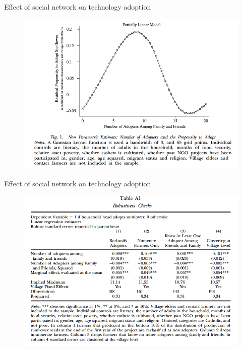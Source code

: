 \documentclass{beamer}
\begin{document}
\begin{frame}{Effect of social network on technology adoption}{}
\begin{figure}[h]
\begin{centering}
  \includegraphics[width=\textwidth]{01fig1}
   \label{fig:01fig1}
\end{centering}
\end{figure}
\end{frame}

\begin{frame}{Effect of social network on technology adoption}{}
\begin{figure}[h]
\begin{centering}
  \includegraphics[width=\textwidth]{01tablea1}
   \label{fig:01tablea1}
\end{centering}
\end{figure}
\end{frame}
\end{document}
